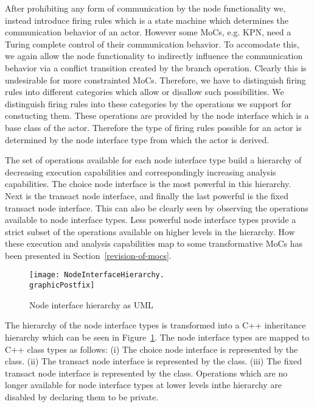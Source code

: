 After prohibiting any form of communication by the node functionality we,
instead introduce firing rules which is a state machine which determines
the communication behavior of an actor. However some MoCs, e.g. KPN, need
a Turing complete control of their communication behavior. To
accomodate this, we again allow the node functionality to indirectly
influence the communication behavior via a conflict transition
created by the branch operation. Clearly this is undesirable for more
constrainted MoCs. Therefore, we have to distinguish firing rules into
different categories which allow or disallow such possibilities. We
distinguish firing rules into these categories by the operations we
support for constucting them. These operations are provided by the
node interface which is a base class of the actor. Therefore the
type of firing rules possible for an actor is determined by the
node interface type from which the actor is derived.


The set of operations available for each node interface type
build a hierarchy of decreasing execution capabilities and
correspondingly increasing analysis capabilities.
The choice node interface is the most powerful in this hierarchy.
Next is the transact node interface, and finally the last powerful is the
fixed transact node interface. This can also be clearly seen
by observing the operations available to node interface types.
Less powerful node interface types provide a strict subset of
the operations available on higher levels in the hierarchy.
How these execution and analysis capabilities map to some transformative
MoCs has been presented in Section~\ref{revision-of-mocs}.

\begin{figure}[h]
\centering
\texttt{[image: NodeInterfaceHierarchy.\\graphicPostfix]}\\
\caption{\label{node-interface-hierarchy}Node interface hierarchy as UML}
\end{figure}

The hierarchy of the node interface types is transformed into
a C++ inheritance hierarchy which can be seen in Figure~\ref{node-interface-hierarchy}.
The node interface types are mapped to C++ class types as follows:
(i) The choice node interface is represented by the  class.
(ii) The transact node interface is represented by the  class.
(iii) The fixed transact node interface is represented by the  class.
Operations which are no longer available for node interface types
at lower levels inthe hierarchy are disabled by declaring them to be private.

